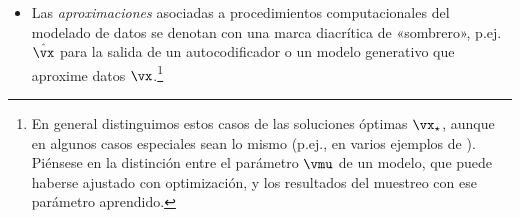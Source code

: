 \documentclass[../book-main_es.tex]{subfiles}
\begin{document}
\begin{itemize}
    \item Las \textit{aproximaciones} asociadas a procedimientos computacionales del
        modelado de datos se denotan con una marca diacrítica de «sombrero», p.ej. $\hat{\vx}$ para
        la salida de un autocodificador o un modelo generativo que aproxime
        datos $\vx$.\footnote{En general distinguimos estos casos de las soluciones
        óptimas $\vx_{\star}$, aunque en algunos casos especiales sean lo mismo
        (p.ej., en varios ejemplos de ). Piénsese en
        la distinción entre el parámetro $\vmu$ de un modelo, que puede haberse
        ajustado con optimización, y los resultados del muestreo con ese parámetro
        aprendido.}
\end{itemize}
\end{document}
